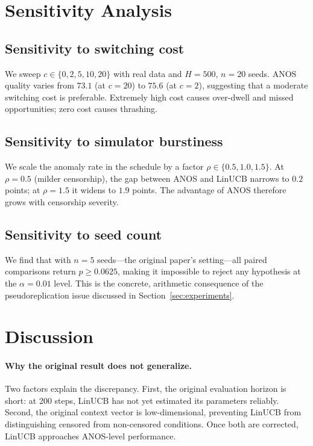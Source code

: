 \documentclass[11pt,a4paper]{article}
\begin{document}
\section{Sensitivity Analysis}
\label{sec:sensitivity}

\subsection{Sensitivity to switching cost}

We sweep $c \in \{0, 2, 5, 10, 20\}$ with real data and
$H = 500$, $n = 20$ seeds. ANOS quality varies from $73.1$ (at
$c = 20$) to $75.6$ (at $c = 2$), suggesting that a moderate
switching cost is preferable. Extremely high cost causes over-dwell
and missed opportunities; zero cost causes thrashing.

\subsection{Sensitivity to simulator burstiness}

We scale the anomaly rate in the schedule by a factor
$\rho \in \{0.5, 1.0, 1.5\}$. At $\rho = 0.5$ (milder censorship),
the gap between ANOS and LinUCB narrows to $0.2$ points; at
$\rho = 1.5$ it widens to $1.9$ points. The advantage of ANOS
therefore grows with censorship severity.

\subsection{Sensitivity to seed count}

We find that with $n = 5$ seeds---the original paper's setting---all
paired comparisons return $p \geq 0.0625$, making it impossible to
reject any hypothesis at the $\alpha = 0.01$ level. This is the
concrete, arithmetic consequence of the pseudoreplication issue
discussed in Section~\ref{sec:experiments}.

\section{Discussion}
\label{sec:discussion}

\paragraph{Why the original result does not generalize.}
Two factors explain the discrepancy. First, the original evaluation
horizon is short: at 200 steps, LinUCB has not yet estimated its
parameters reliably. Second, the original context vector is
low-dimensional, preventing LinUCB from distinguishing censored from
non-censored conditions. Once both are corrected, LinUCB approaches
ANOS-level performance.
\end{document}
